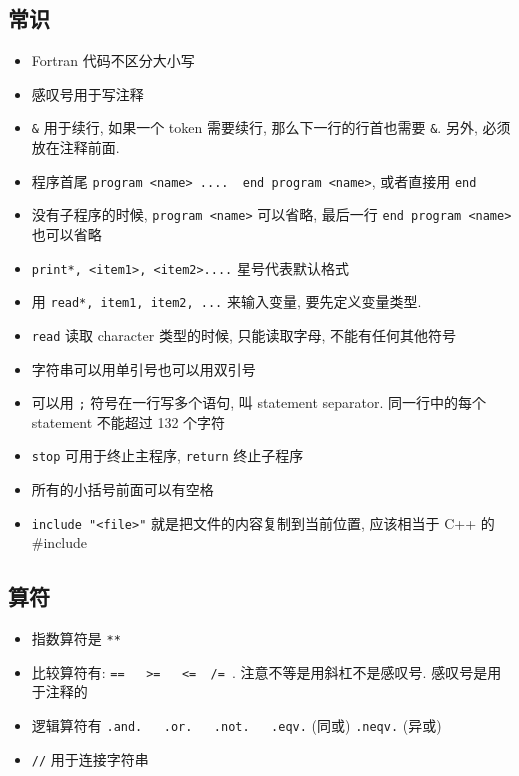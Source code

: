 
\subsection{常识}
\begin{itemize}
\item Fortran 代码不区分大小写
\item 感叹号用于写注释
\item \verb`&` 用于续行, 如果一个 token 需要续行, 那么下一行的行首也需要 \verb`&`. 另外, 必须放在注释前面.
\item 程序首尾  \verb`program <name> ....  end program <name>`, 或者直接用 \verb`end`
\item 没有子程序的时候, \verb`program <name>` 可以省略, 最后一行 \verb`end program <name>` 也可以省略
\item \verb`print*, <item1>, <item2>....` 星号代表默认格式
\item 用 \verb`read*, item1, item2, ...` 来输入变量, 要先定义变量类型. 
\item \verb`read` 读取 character 类型的时候, 只能读取字母, 不能有任何其他符号
\item 字符串可以用单引号也可以用双引号
\item 可以用 \verb`;` 符号在一行写多个语句, 叫 statement separator. 同一行中的每个 statement 不能超过 132 个字符
\item \verb`stop` 可用于终止主程序, \verb`return` 终止子程序
\item 所有的小括号前面可以有空格
\item \verb`include "<file>"` 就是把文件的内容复制到当前位置, 应该相当于 C++ 的 #include
\end{itemize}

\subsection{算符}
\begin{itemize}
\item 指数算符是 \verb`**`
\item 比较算符有: \verb`==   >=   <=  /= `.  注意不等是用斜杠不是感叹号. 感叹号是用于注释的
\item 逻辑算符有 \verb`.and.   .or.   .not.   .eqv.` (同或)  \verb`.neqv.` (异或)
\item \verb`//` 用于连接字符串
\end{itemize}

